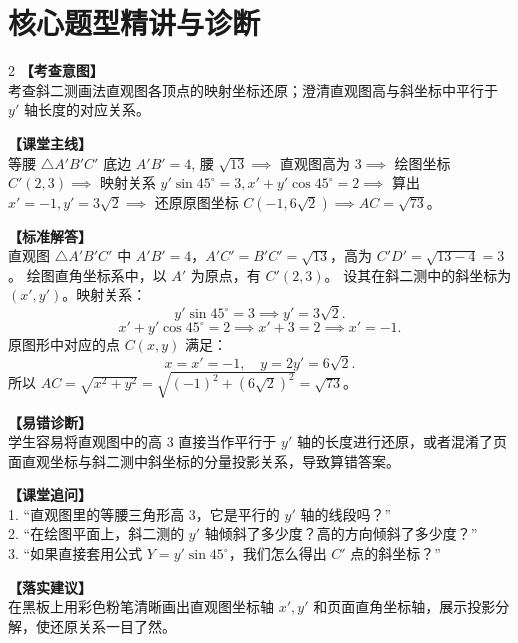 \documentclass[11pt,a4paper]{ctexart}
\begin{document}
\newpage

\section{核心题型精讲与诊断}


\qTJWObliqueProjectionStem

\begin{center}
  \qTJWObliqueProjectionFigure[0.95]
\end{center}

\vspace{0.8em}

\begin{paracol}{2}
  \textbf{【考查意图】}\\
  考查斜二测画法直观图各顶点的映射坐标还原；澄清直观图高与斜坐标中平行于 $y'$ 轴长度的对应关系。
  
  \textbf{【课堂主线】}\\
  等腰 $\triangle A'B'C'$ 底边 $A'B'=4$, 腰 $\sqrt{13} \implies$ 直观图高为 $3 \implies$ 绘图坐标 $C'(2,3) \implies$ 映射关系 $y'\sin 45^\circ = 3, x'+y'\cos 45^\circ = 2 \implies$ 算出 $x'=-1, y'=3\sqrt{2} \implies$ 还原原图坐标 $C(-1, 6\sqrt{2}) \implies AC = \sqrt{73}$。
  
  \textbf{【标准解答】}\\
  直观图 $\triangle A'B'C'$ 中 $A'B'=4$，$A'C'=B'C'=\sqrt{13}$，高为 $C'D' = \sqrt{13-4}=3$。
  绘图直角坐标系中，以 $A'$ 为原点，有 $C'(2,3)$。
  设其在斜二测中的斜坐标为 $(x', y')$。映射关系：
  \[ y'\sin 45^\circ = 3 \implies y' = 3\sqrt{2}. \]
  \[ x' + y'\cos 45^\circ = 2 \implies x' + 3 = 2 \implies x' = -1. \]
  原图形中对应的点 $C(x, y)$ 满足：
  \[ x = x' = -1,\quad y = 2y' = 6\sqrt{2}. \]
  所以 $AC = \sqrt{x^2 + y^2} = \sqrt{(-1)^2 + (6\sqrt{2})^2} = \sqrt{73}$。

  \switchcolumn
  \textbf{【易错诊断】}\\
  学生容易将直观图中的高 $3$ 直接当作平行于 $y'$ 轴的长度进行还原，或者混淆了页面直观坐标与斜二测中斜坐标的分量投影关系，导致算错答案。
  
  \textbf{【课堂追问】}\\
  1. “直观图里的等腰三角形高 $3$，它是平行的 $y'$ 轴的线段吗？”\\
  2. “在绘图平面上，斜二测的 $y'$ 轴倾斜了多少度？高的方向倾斜了多少度？”\\
  3. “如果直接套用公式 $Y = y'\sin 45^\circ$，我们怎么得出 $C'$ 点的斜坐标？”
  
  \textbf{【落实建议】}\\
  在黑板上用彩色粉笔清晰画出直观图坐标轴 $x', y'$ 和页面直角坐标轴，展示投影分解，使还原关系一目了然。
\end{paracol}
\end{document}
